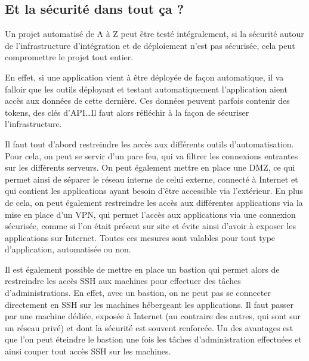 \subsection{Et la sécurité dans tout ça ?}

Un projet automatisé de A à Z peut être testé intégralement, si la sécurité autour de l'infrastructure d'intégration et de déploiement n'est pas sécurisée, cela peut compromettre le projet tout entier.

En effet, si une application vient à être déployée de façon automatique, il va falloir que les outils déployant et testant automatiquement l'application aient accès aux données de cette dernière. Ces données peuvent parfois contenir des tokens, des clés d'\gls{API}\ldots Il faut alors réfléchir à la façon de sécuriser l'infrastructure. 

Il faut tout d'abord restreindre les accès aux différents outils d'automatisation. Pour cela, on peut se servir d'un pare feu, qui va filtrer les connexions entrantes sur les différents serveurs. On peut également mettre en place une \gls{DMZ}, ce qui permet ainsi de séparer le réseau interne de celui externe, connecté à Internet et qui contient les applications ayant besoin d'être accessible via l'extérieur. En plus de cela, on peut également restreindre les accès aux différentes applications via la mise en place d'un \gls{VPN}, qui permet l'accès aux applications via une connexion sécurisée, comme si l'on était présent sur site et évite ainsi d'avoir à exposer les applications sur Internet. Toutes ces mesures sont valables pour tout type d'application, automatisée ou non. 

Il est également possible de mettre en place un bastion qui permet alors de restreindre les accès \gls{SSH} aux machines pour effectuer des tâches d'administrations. En effet, avec un bastion, on ne peut pas se connecter directement en \gls{SSH} sur les machines hébergeant les applications. Il faut passer par une machine dédiée, exposée à Internet (au contraire des autres, qui sont sur un réseau privé) et dont la sécurité est souvent renforcée. Un des avantages est que l'on peut éteindre le bastion une fois les tâches d'administration effectuées et ainsi couper tout accès \gls{SSH} sur les machines.



